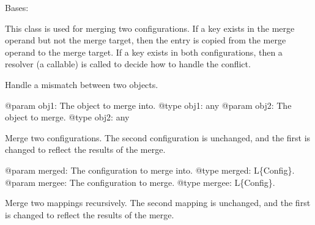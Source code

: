 \documentclass[a4paper,10pt,english]{sphinxmanual}
\begin{document}

\begin{fulllineitems}
\label{commands/apidoc/src:src.pyconf.ConfigMerger}
Bases: 

This class is used for merging two configurations. If a key exists in the
merge operand but not the merge target, then the entry is copied from the
merge operand to the merge target. If a key exists in both configurations,
then a resolver (a callable) is called to decide how to handle the
conflict.

\begin{fulllineitems}
\label{commands/apidoc/src:src.pyconf.ConfigMerger.handleMismatch}
Handle a mismatch between two objects.

@param obj1: The object to merge into.
@type obj1: any
@param obj2: The object to merge.
@type obj2: any

\end{fulllineitems}


\begin{fulllineitems}
\label{commands/apidoc/src:src.pyconf.ConfigMerger.merge}
Merge two configurations. The second configuration is unchanged,
and the first is changed to reflect the results of the merge.

@param merged: The configuration to merge into.
@type merged: L\{Config\}.
@param mergee: The configuration to merge.
@type mergee: L\{Config\}.

\end{fulllineitems}


\begin{fulllineitems}
\label{commands/apidoc/src:src.pyconf.ConfigMerger.mergeMapping}
Merge two mappings recursively. The second mapping is unchanged,
and the first is changed to reflect the results of the merge.


\end{fulllineitems}
\end{fulllineitems}
\end{document}
